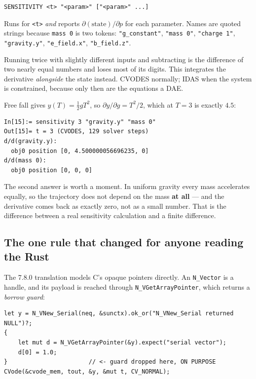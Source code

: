 \documentclass[11pt]{article}
\newcommand{\code}[1]{\texttt{#1}}
\begin{document}
\begin{lstlisting}
SENSITIVITY <t> "<param>" ["<param>" ...]
\end{lstlisting}

Runs for \code{<t>} \emph{and} reports $\partial(\text{state})/\partial
p$ for each parameter. Names are quoted strings because \code{mass 0} is
two tokens: \code{"g\_constant"}, \code{"mass 0"}, \code{"charge 1"},
\code{"gravity.y"}, \code{"e\_field.x"}, \code{"b\_field.z"}.

Running twice with slightly different inputs and subtracting is the
difference of two nearly equal numbers and loses most of its digits.
This integrates the derivative \emph{alongside} the state instead.
CVODES normally; IDAS when the system is constrained, because only then
are the equations a DAE.

Free fall gives $y(T)=\tfrac12 gT^2$, so $\partial y/\partial g = T^2/2$,
which at $T=3$ is exactly $4.5$:

\begin{lstlisting}
In[15]:= sensitivity 3 "gravity.y" "mass 0"
Out[15]= t = 3 (CVODES, 129 solver steps)
d/d(gravity.y):
  obj0 position [0, 4.500000056696235, 0]
d/d(mass 0):
  obj0 position [0, 0, 0]
\end{lstlisting}

The second answer is worth a moment. In uniform gravity every mass
accelerates equally, so the trajectory does not depend on the mass
\textbf{at all} --- and the derivative comes back as exactly zero, not as
a small number. That is the difference between a real sensitivity
calculation and a finite difference.

\subsection{The one rule that changed for anyone reading the Rust}

The 7.8.0 translation models C's opaque pointers directly. An
\code{N\_Vector} is a handle, and its payload is reached through
\code{N\_VGetArrayPointer}, which returns a \emph{borrow guard}:

\begin{lstlisting}
let y = N_VNew_Serial(neq, &sunctx).ok_or("N_VNew_Serial returned NULL")?;
{
    let mut d = N_VGetArrayPointer(&y).expect("serial vector");
    d[0] = 1.0;
}                       // <- guard dropped here, ON PURPOSE
CVode(&cvode_mem, tout, &y, &mut t, CV_NORMAL);
\end{lstlisting}
\end{document}

